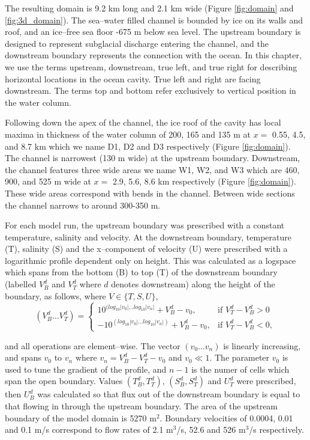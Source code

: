 The resulting domain is 9.2 km long and 2.1 km wide (Figure \ref{fig:domain} and \ref{fig:3d_domain}). The sea--water filled channel is bounded by ice on its walls and roof, and an ice--free sea floor -675 m below sea level. The upstream boundary is designed to represent subglacial discharge entering the channel, and the downstream boundary represents the connection with the ocean. In this chapter, we use the terms upstream, downstream, true left, and true right for describing horizontal locations in the ocean cavity. True left and right are facing downstream.
The terms top and bottom refer exclusively to vertical position in the water column.

Following down the apex of the channel, the ice roof of the cavity has local maxima in thickness of the water column of 200, 165 and 135 m at $x=$ 0.55, 4.5, and 8.7 km which we name D1, D2 and D3 respectively (Figure \ref{fig:domain}). The channel is narrowest (130 m wide) at the upstream boundary. Downstream, the channel features three wide areas we name W1, W2, and W3 which are 460, 900, and 525 m wide at $x =$ 2.9, 5.6, 8.6 km respectively (Figure \ref{fig:domain}). These wide areas correspond with bends in the channel. Between wide sections the channel narrows to around 300-350 m. 


For each model run, the upstream boundary was prescribed with a constant temperature, salinity and velocity. At the downstream boundary, temperature (T), salinity (S) and the x--component of velocity (U) were prescribed with a logarithmic profile dependent only on height. This was calculated as a logspace which spans from the bottom (B) to top (T) of the downstream boundary (labelled $V^d_B$ and $V^d_T $ where $d$ denotes downstream) along the height of the boundary, as follows, where $V \in \{T,S,U\}$,
\[
    \left(V^d_B \dots V^d_T \right)= 
\begin{cases}
    10^{(log_{10}|v_0|...log_{10}|v_n|} + V^d_B - v_0, & \text{if } V^d_T - V^d_B>0\\
    -10^{(log_{10}|v_0|...log_{10}|v_n|)} + V^d_B - v_0,              & \text{if }   V^d_T - V^d_B<0,
\end{cases}
\]

and all operations are element--wise. The vector $(v_0...v_n)$ is linearly increasing, and spans $v_0$ to $v_n$ where $ v_n = V^d_B - V^d_T-v_0$ and $v_0 \ll 1$. The parameter $v_0$ is used to tune the gradient of the profile, and $n-1$ is the numer of cells which span the open boundary.
Values $\left(T^d_B, T^d_T\right)$, $\left(S^d_B, S^d_T\right)$ and $U^d_T$  were prescribed, then  $U^d_B$ was calculated so that flux out of the downstream boundary is equal to that flowing in through the upstream boundary.
The area of the upstream boundary of the model domain is 5270 $\mathrm{m}^2$. Boundary velocities of 0.0004, 0.01 and 0.1 $\mathrm{m}$/s correspond to flow rates of 2.1 $\mathrm{m}^3$/s, 52.6 and 526 $\mathrm{m}^3$/s respectively. 

